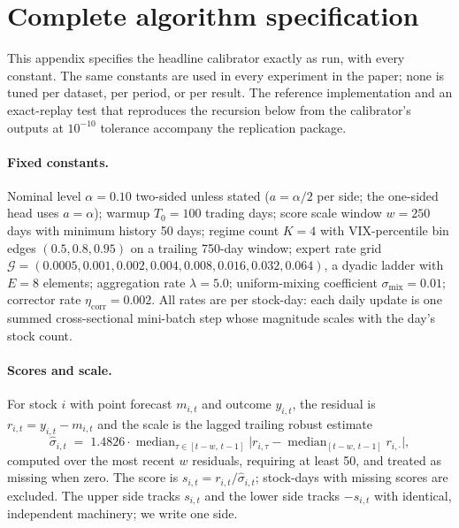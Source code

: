 
\appendix

\section{Complete algorithm specification}\label{app:algorithm}

This appendix specifies the headline calibrator exactly as run, with
every constant. The same constants are used in every experiment in the
paper; none is tuned per dataset, per period, or per result. The
reference implementation and an exact-replay test that reproduces the
recursion below from the calibrator's outputs at $10^{-10}$ tolerance
accompany the replication package.

\paragraph{Fixed constants.} Nominal level $\alpha = 0.10$ two-sided
unless stated ($a = \alpha/2$ per side; the one-sided head uses
$a = \alpha$); warmup $T_0 = 100$ trading days; score scale window
$w = 250$ days with minimum history 50 days; regime count $K = 4$ with
VIX-percentile bin edges $(0.5, 0.8, 0.95)$ on a trailing 750-day
window; expert rate grid $\mathcal{G} = (0.0005, 0.001, 0.002, 0.004,
0.008, 0.016, 0.032, 0.064)$, a dyadic ladder with $E = 8$ elements;
aggregation rate $\lambda = 5.0$; uniform-mixing coefficient
$\sigma_{\mathrm{mix}} = 0.01$; corrector rate
$\eta_{\mathrm{corr}} = 0.002$. All rates are per stock-day: each daily update is one summed
cross-sectional mini-batch step whose magnitude scales with the day's
stock count.

\paragraph{Scores and scale.} For stock $i$ with point forecast
$m_{i,t}$ and outcome $y_{i,t}$, the residual is
$r_{i,t} = y_{i,t} - m_{i,t}$ and the scale is the lagged trailing
robust estimate
\[
  \hat\sigma_{i,t} \;=\; 1.4826 \cdot \operatorname{median}_{\tau \in
  [t-w,\, t-1]} \bigl| r_{i,\tau} -
  \operatorname{median}_{[t-w,\,t-1]} r_{i,\cdot} \bigr| ,
\]
computed over the most recent $w$ residuals, requiring at least 50, and
treated as missing when zero. The score is
$s_{i,t} = r_{i,t} / \hat\sigma_{i,t}$; stock-days with missing scores
are excluded. The upper side tracks $s_{i,t}$ and the lower side tracks
$-s_{i,t}$ with identical, independent machinery; we write one side.

